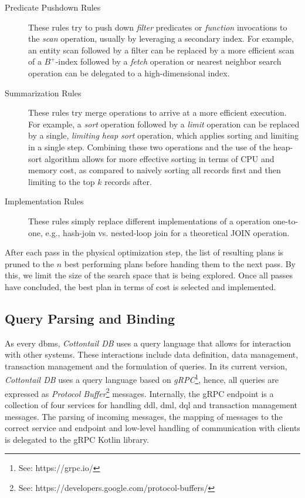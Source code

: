 \begin{description}
    \item[Predicate Pushdown Rules] These rules try to push down \emph{filter} predicates or \emph{function} invocations to the \emph{scan} operation, usually by leveraging a secondary index. For example, an entity scan followed by a filter can be replaced by a more efficient scan of a $B^+$-index followed by a \emph{fetch} operation or nearest neighbor search operation can be delegated to a high-dimensional index.
 
    \item[Summarization Rules] These rules try merge operations to arrive at a more efficient execution. For example, a \emph{sort} operation followed by a \emph{limit} operation can be replaced by a single, \emph{limiting heap sort} operation, which applies sorting and limiting in a single step. Combining these two operations and the use of the heap-sort algorithm allows for more effective sorting in terms of CPU and memory cost, as compared to naively sorting all records first and then limiting to the top $k$ records after.
    
    \item[Implementation Rules] These rules simply replace different implementations of a operation one-to-one, e.g., hash-join vs. nested-loop join for a theoretical JOIN operation.
\end{description}

After each pass in the physical optimization step, the list of resulting plans is pruned to the $n$ best performing plans before handing them to the next pass. By this, we limit the size of the search space that is being explored. Once all passes have concluded, the best plan in terms of cost is selected and implemented.

\subsection{Query Parsing and Binding}
As every \acrshort{dbms}, \emph{Cottontail DB} uses a query language that allows for interaction with other systems. These interactions include data definition, data management, transaction management and the formulation of queries. In its current version, \emph{Cottontail DB} uses a query language based on \emph{gRPC}\footnote{See: https://grpc.io/}, hence, all queries are expressed as \emph{Protocol Buffer}\footnote{See: https://developers.google.com/protocol-buffers/} messages. Internally, the gRPC endpoint is a collection of four services for handling \acrshort{ddl}, \acrshort{dml}, \acrshort{dql} and transaction management messages. The parsing of incoming messages, the mapping of messages to the correct service and endpoint and low-level handling of communication with clients is delegated to the gRPC Kotlin library. 


